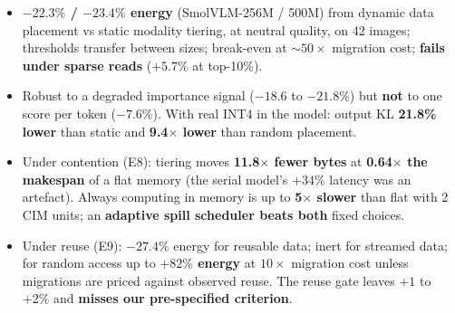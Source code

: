\documentclass[10pt,a4paper]{article}
\begin{document}
\begin{center}
{\begin{minipage}{0.955\linewidth}
\begin{itemize}[leftmargin=1.3em,itemsep=0pt,topsep=2pt]
\item \textbf{$-22.3\%$ / $-23.4\%$ energy} (SmolVLM-256M / 500M) from dynamic data placement vs static modality tiering, at neutral quality, on 42 images; thresholds transfer between sizes; break-even at $\sim\!50\times$ migration cost; \textbf{fails under sparse reads} ($+5.7\%$ at top-10\%).
\item Robust to a degraded importance signal ($-18.6$ to $-21.8\%$) but \textbf{not} to one score per token ($-7.6\%$). With real INT4 in the model: output KL \textbf{21.8\% lower} than static and \textbf{9.4$\times$ lower} than random placement.
\item Under contention (E8): tiering moves \textbf{11.8$\times$ fewer bytes} at \textbf{0.64$\times$ the makespan} of a flat memory (the serial model's $+34\%$ latency was an artefact). Always computing in memory is up to \textbf{5$\times$ slower} than flat with 2 CIM units; an \textbf{adaptive spill scheduler beats both} fixed choices.
\item Under reuse (E9): \textbf{$-27.4\%$} energy for reusable data; inert for streamed data; for random access up to \textbf{$+82\%$ energy} at $10\times$ migration cost unless migrations are priced against observed reuse. The reuse gate leaves $+1$ to $+2\%$ and \textbf{misses our pre-specified criterion}.
\end{itemize}
\end{minipage}}
\end{center}
\vspace{2pt}
\end{document}
